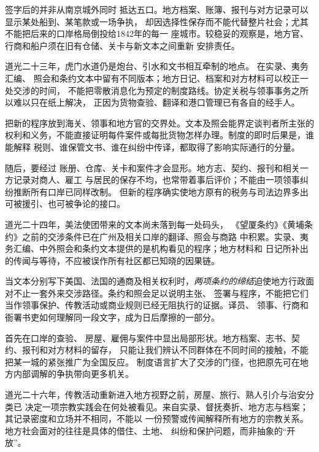 签字后的并非从南京城外同时
抵达五口。地方档案、账簿、报刊与对方记录可以显示某处船到、某笔款或一场争执，
却因选择性保存而不能代替整片社会；尤其不能把后来的口岸格局倒投给1842年的每一
座城市。较稳妥的观察是，地方官、行商和船户须在旧有仓储、关卡与新文本之间重新
安排责任。

道光二十三年，虎门水道仍是炮台、引水和文书相互牵制的地点。
在实录、夷务汇编、
照会和条约文本中留有不同版本；地方日记、档案和对方材料可以校正一处交涉的时间，
不能把零散消息化为预定的制度路线。协定关税与领事事务之所以难以只在纸上解决，
正因为货物查验、翻译和港口管理已有各自的经手人。

把新的程序放到海关、领事和地方官的交界处。文本及照会能界定谈判者所主张的
权利和义务，不能直接证明每件案件或每批货物怎样办理。制度的即时后果是，谁能解释
税则、谁保管文书、谁在纠纷中传译，都取得了影响实际通行的分量。

随后，要经过
账册、仓库、关卡和案件才会显形。地方志、契约、报刊和相关一方记录对商人、雇工
与居民的保存不均，也常带着事后评价；不能由一项领事纠纷推断所有口岸已同样改制。
但新的程序确实使地方原有的税务与司法边界多出可被援引、也可被争论的接口。

道光二十四年，美法使团带来的文本尚未落到每一处码头，
{《望厦条约》《黄埔条约》之前的交涉条件}已在广州及相关口岸的翻译、照会与商路
中积累。实录、夷务汇编、中外照会和条约文本提供的是机构看见的程序；地方材料和
日记所补出的传闻与等待，不应被误作所有社区都已知晓的因果链。

当文本分别写下美国、法国的通商及相关权利时，\emph
{两项条约的缔结}迫使地方行政面对不止一套外来交涉路径。条约和照会足以说明主张、
签署与程序，不能把它们当作领事保护、传教活动或商业规则已经无阻执行的证据。译员、
领事、行商和衙署书吏如何理解同一段文字，成为日后摩擦的一部分。

首先在口岸的查验、
房屋、雇佣与案件中显出局部形状。地方档案、志书、契约、报刊和对方材料的留存，
只能让我们辨认不同群体在不同时间的接触，不能把某一城的紧张推广为全国反应。
制度语言扩大了交涉的门径，也把原先可在地方内部调解的争执带向更多机关。

道光二十六年，传教活动重新进入地方视野之前，房屋、旅行、熟人引介与治安分类已
决定一项宗教实践会在何处被看见。来自实录、督抚奏折、地方志与档案；其记录密度和立场并不相同，不能以
一份预警或传闻解释所有地方的宗教关系。地方社会面对的往往是具体的借住、土地、
纠纷和保护问题，而非抽象的“开放”。


